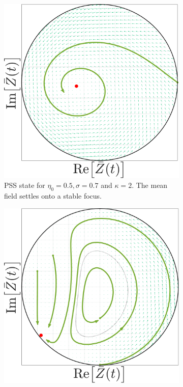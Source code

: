 \begin{figure}[H]
\begin{subfigure}[b]{0.32\linewidth}
  \includegraphics[width=\linewidth]{../Figures/PhaseSpace/MFOARPSS_random.pdf}
   \caption{PSS state for $\eta_0 = 0.5, \sigma = 0.7$ and $\kappa= 2$. The mean field settles onto a stable focus.}
   \label{fig:MFOARPSS_random}
\end{subfigure} \hfill
\begin{subfigure}[b]{0.32\linewidth}
   \centering
  \includegraphics[width=\linewidth]{../Figures/PhaseSpace/MFOARCPW_random.pdf}

\end{subfigure}
\end{figure}
